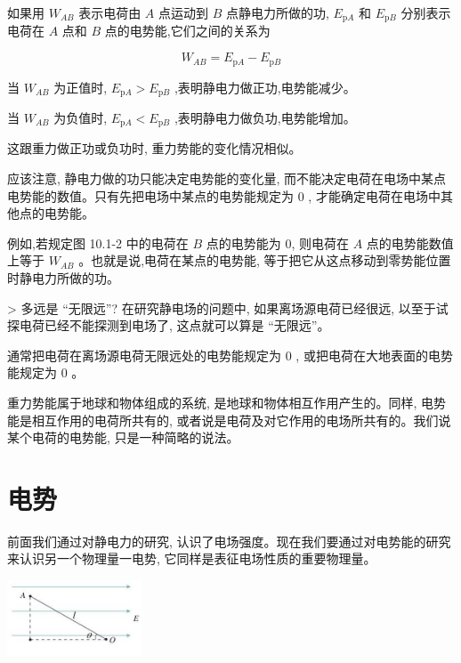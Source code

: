\documentclass[10pt]{article}
\begin{document}
如果用 \({W}_{AB}\) 表示电荷由 \(A\) 点运动到 \(B\) 点静电力所做的功, \({E}_{\mathrm{p}A}\) 和 \({E}_{\mathrm{p}B}\) 分别表示电荷在 \(A\) 点和 \(B\) 点的电势能,它们之间的关系为

\[
{W}_{AB} = {E}_{\mathrm{p}A} - {E}_{\mathrm{p}B}
\]

当 \({W}_{AB}\) 为正值时, \({E}_{\mathrm{p}A} > {E}_{\mathrm{p}B}\) ,表明静电力做正功,电势能减少。

当 \({W}_{AB}\) 为负值时, \({E}_{\mathrm{p}A} < {E}_{\mathrm{p}B}\) ,表明静电力做负功,电势能增加。

这跟重力做正功或负功时, 重力势能的变化情况相似。

应该注意, 静电力做的功只能决定电势能的变化量, 而不能决定电荷在电场中某点电势能的数值。只有先把电场中某点的电势能规定为 0 , 才能确定电荷在电场中其他点的电势能。

例如,若规定图 10.1-2 中的电荷在 \(B\) 点的电势能为 0, 则电荷在 \(A\) 点的电势能数值上等于 \({W}_{AB}\) 。也就是说,电荷在某点的电势能, 等于把它从这点移动到零势能位置时静电力所做的功。

\begin{mdframed}

> 多远是 “无限远”? 在研究静电场的问题中, 如果离场源电荷已经很远, 以至于试探电荷已经不能探测到电场了, 这点就可以算是 “无限远”。

\end{mdframed}

通常把电荷在离场源电荷无限远处的电势能规定为 0 , 或把电荷在大地表面的电势能规定为 0 。

重力势能属于地球和物体组成的系统, 是地球和物体相互作用产生的。同样, 电势能是相互作用的电荷所共有的, 或者说是电荷及对它作用的电场所共有的。我们说某个电荷的电势能, 只是一种简略的说法。

\section*{电势}

前面我们通过对静电力的研究, 认识了电场强度。现在我们要通过对电势能的研究来认识另一个物理量一电势, 它同样是表征电场性质的重要物理量。

\begin{center}
\includegraphics[max width=0.3\textwidth]{images/01911d5f-8e38-70c0-b5b8-2b399bd115b6_33_926730.jpg}
\end{center}
\end{document}
